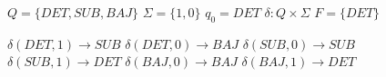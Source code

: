 $Q=\{DET, SUB, BAJ\}$
$\Sigma=\{1, 0\}$
$q_0 = DET$
$\delta:Q \times \Sigma$
$F =\{DET\}$

$\delta(DET,1)\rightarrow SUB$
$\delta(DET,0)\rightarrow BAJ$
$\delta(SUB,0)\rightarrow SUB$
$\delta(SUB,1)\rightarrow DET$
$\delta(BAJ,0)\rightarrow BAJ$
$\delta(BAJ,1)\rightarrow DET$
